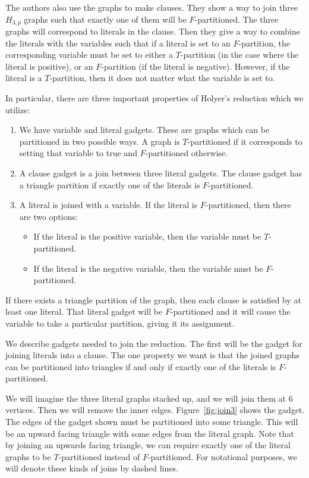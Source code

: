 \documentclass[runningheads,a4paper]{llncs}
\begin{document}
The authors also use the graphs to make clauses. They show a way to join three $H_{3,p}$ graphs such that exactly one of them will be $F$-partitioned. The three graphs will correspond to literals in the clause. Then they give a way to combine the literals with the variables such that if a literal is set to an $F$-partition, the corresponding variable must be set to either a $T$-partition (in the case where the literal is positive), or an $F$-partition (if the literal is negative). However, if the literal is a $T$-partition, then it does not matter what the variable is set to. 

In particular, there are three important properties of Holyer's reduction which we utilize:
\begin{enumerate}
\item We have variable and literal gadgets. These are graphs which can be partitioned in two possible ways. A graph is $T$-partitioned if it corresponds to setting that variable to true and $F$-partitioned otherwise.  
\item A clause gadget is a join between three literal gadgets. The clause gadget has a triangle partition if exactly one of the literals is $F$-partitioned.
\item A literal is joined with a variable. If the literal is $F$-partitioned, then there are two options:
\begin{itemize}
\item If the literal is the positive variable, then the variable must be $T$-partitioned.
\item If the literal is the negative variable, then the variable must be $F$-partitioned.
\end{itemize}
\end{enumerate}

If there exists a triangle partition of the graph, then each clause is satisfied by at least one literal. That literal gadget will be $F$-partitioned and it will cause the variable to take a particular partition, giving it its assignment. 

We describe gadgets needed to join the reduction. The first will be the gadget for joining literals into a clause. The one property we want is that the joined graphs can be partitioned into triangles if and only if exactly one of the literals is $F$-partitioned. 

We will imagine the three literal graphs stacked up, and we will join them at 6 vertices. Then we will remove the inner edges. Figure~\ref{fig:join3} shows the gadget. The edges of the gadget shown must be partitioned into some triangle. This will be an upward facing triangle with some edges from the literal graph. Note that by joining an upwards facing triangle, we can require exactly one of the literal graphs to be $T$-partitioned instead of $F$-partitioned. For notational purposes, we will denote these kinds of joins by dashed lines.
\end{document}

